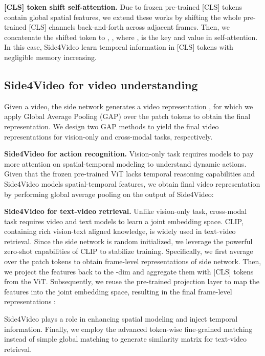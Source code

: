 \documentclass[10pt,twocolumn,letterpaper]{article}
\begin{document}
\noindent\textbf{[CLS] token shift self-attention.} 
Due to frozen pre-trained [CLS] tokens contain global spatial features, we extend these works \cite{tsm, ts2_net, shift_transformer} by shifting the whole pre-trained [CLS] channels back-and-forth across adjacent frames. 
Then, we concatenate the shifted token to , , where ,  is the key and value in self-attention. In this case, Side4Video learn temporal information in [CLS] tokens with negligible memory increasing.


\subsection{Side4Video for video understanding}
\label{subsec: for video understanding}
Given a video, the side network generates a video representation , for which we apply Global Average Pooling (GAP) over the patch tokens to obtain the final representation. We design two GAP methods to yield the final video representations for vision-only and cross-modal tasks, respectively.

\noindent\textbf{Side4Video for action recognition.} Vision-only task requires models to pay more attention on spatial-temporal modeling to understand dynamic actions. Given that the frozen pre-trained ViT lacks temporal reasoning capabilities and Side4Video models spatial-temporal features, we obtain final video representation by performing global average pooling on the output of Side4Video:



\noindent\textbf{Side4Video for text-video retrieval.} Unlike vision-only task, cross-modal task requires video and text models to learn a joint embedding space. CLIP, containing rich vision-text aligned knowledge, is widely used in text-video retrieval. Since the side network is random initialized, we leverage the powerful zero-shot capabilities of CLIP to stabilize training. Specifically, we first average over the patch tokens to obtain frame-level representations of side network. Then, we project the features back to the -dim and aggregate them with [CLS] tokens from the ViT. Subsequently, we reuse the pre-trained projection layer  to map the features into the joint embedding space, resulting in the final frame-level representations :

Side4Video plays a role in enhancing spatial modeling and inject temporal information. 
Finally, we employ the advanced token-wise fine-grained matching~\cite{filip,drl} instead of simple global matching to generate similarity matrix for text-video retrieval.
\end{document}
